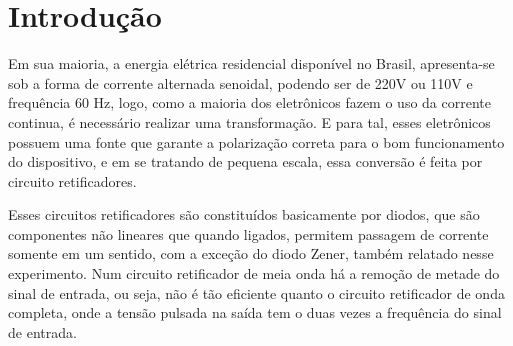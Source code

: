 \chapter*[Introdu\c{c}\~{a}o]{Introdu\c{c}\~{a}o}
Em sua maioria, a energia elétrica residencial disponível no Brasil, apresenta-se sob a forma de corrente alternada senoidal, podendo ser de 220V ou 110V e frequência 60 Hz, logo, como a maioria dos eletrônicos fazem o uso da corrente continua, é necessário realizar uma transformação. E para tal, esses eletrônicos possuem uma fonte que garante a polarização correta para o bom funcionamento do dispositivo, e em se tratando de pequena escala, essa conversão é feita por circuito retificadores.

Esses circuitos retificadores são constituídos basicamente por diodos, que são componentes não lineares que quando ligados, permitem passagem de corrente somente em um sentido, com a exceção do diodo Zener, também relatado nesse experimento.  Num circuito retificador de meia onda há a remoção de metade do sinal de entrada, ou seja, não é tão eficiente quanto o circuito retificador de onda completa, onde a tensão pulsada na saída tem o duas vezes a frequência do sinal de entrada.   
